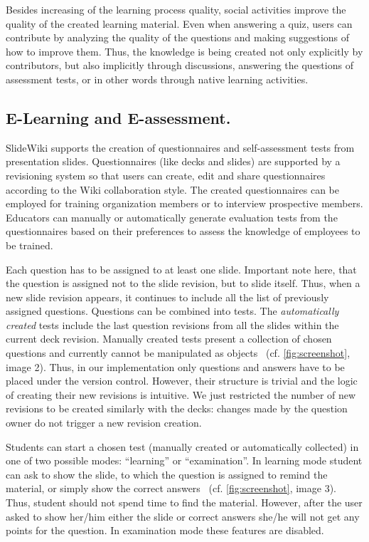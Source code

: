 \documentclass[ngerman,UKenglish,table]{scrbook}
\begin{document}
Besides increasing of the learning process quality, social activities improve the quality of the created learning material.
Even when answering a quiz, users can contribute by analyzing the quality of the questions and making suggestions of how to improve them.
Thus, the knowledge is being created not only explicitly by contributors, but also implicitly through discussions, answering the questions of assessment tests, or in other words through native learning activities.


\subsection{E-Learning and E-assessment.}
SlideWiki supports the creation of questionnaires and self-assessment tests from presentation slides.
Questionnaires (like decks and slides) are supported by a revisioning system so that users can create, edit and share questionnaires according to the Wiki collaboration style.
The created questionnaires can be employed for training organization members or to interview prospective members.
Educators can manually or automatically generate evaluation tests from the questionnaires based on their preferences to assess the knowledge of employees to be trained.

Each question has to be assigned to at least one slide.
Important note here, that the question is assigned not to the slide revision, but to slide itself.
Thus, when a new slide revision appears, it continues to include all the list of previously assigned questions.
Questions can be combined into tests.
The \textit{automatically created} tests include the last question revisions from all the slides within the current deck revision.
Manually created tests present a collection of chosen questions and currently cannot be manipulated as objects ~(cf. \autoref{fig:screenshot}, image 2).
Thus, in our implementation only questions and answers have to be placed under the version control.
However, their structure is trivial and the logic of creating their new revisions is intuitive.
We just restricted the number of new revisions to be created similarly with the decks: changes made by the question owner do not trigger a new revision creation.

Students can start a chosen test (manually created or automatically collected) in one of two possible modes: ``learning'' or ``examination''.
In learning mode student can ask to show the slide, to which the question is assigned to remind the material, or simply show the correct answers ~(cf. \autoref{fig:screenshot}, image 3).
Thus, student should not spend time to find the material.
However, after the user asked to show her/him either the slide or correct answers she/he will not get any points for the question.
In examination mode these features are disabled.
\end{document}
